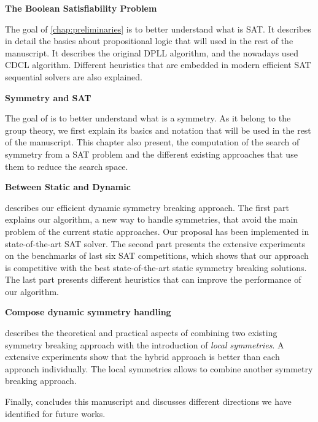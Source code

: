 \textbf{The Boolean Satisfiability Problem}

The goal of \cref{chap:preliminaries} is to better understand what is SAT. It describes in detail
the basics about propositional logic that will used in the rest of the manuscript. 
It describes the original DPLL algorithm, and the nowadays used CDCL algorithm.
Different heuristics that are embedded in modern efficient SAT sequential solvers are also explained. 

\textbf{Symmetry and SAT}

The goal of  is to better understand what is a symmetry. As it belong to the 
group theory, we first explain its basics and notation that will be used in the rest of the manuscript.
This chapter also present, the computation of the search of symmetry from a SAT problem and 
the different existing approaches that use them to reduce the search space.

\textbf{Between Static and Dynamic}

 describes our efficient dynamic symmetry breaking approach.
The first part explains our algorithm, a new way to handle symmetries, that avoid the main problem
of the current static approaches. Our proposal has been implemented in state-of-the-art
SAT solver. The second part presents the extensive experiments on the benchmarks of last six SAT competitions,
which shows that our approach is competitive with the best state-of-the-art static symmetry breaking solutions.
The last part presents different heuristics that can improve the performance of our algorithm.



\textbf{Compose dynamic symmetry handling}

 describes the theoretical and practical aspects of combining two existing
symmetry  breaking approach with the introduction of \textit{local symmetries}.
 A extensive experiments show that the hybrid approach is better than 
each approach individually. The local symmetries allows to combine another 
symmetry breaking approach.

Finally,  concludes this manuscript and discusses different directions we have identified for future works.
 


